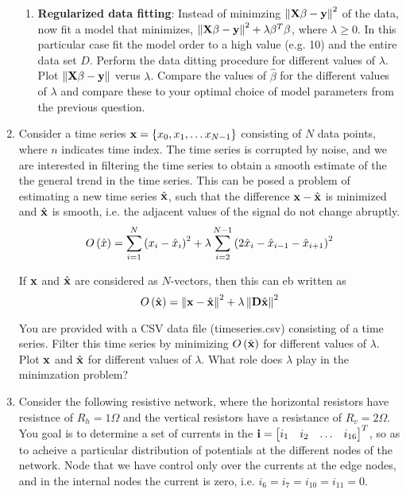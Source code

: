 \documentclass[9pt]{article}
\def\mf{\ensuremath\mathbf}
\def\lp{\ensuremath\left(}
\def\rp{\ensuremath\right)}
\def\lV{\ensuremath\left\lVert}
\def\rV{\ensuremath\right\rVert}
\def\lc{\ensuremath\left\{}
\def\rc{\ensuremath\right\}}
\def\bmx{\ensuremath\begin{bmatrix*}[r]}
\def\emx{\ensuremath\end{bmatrix*}}
\begin{document}
\begin{multicols}{2}
\begin{enumerate}
\begin{enumerate}
        \item \textbf{Regularized data fitting}: Instead of minimzing $\lV\mf{X}\beta - \mf{y}\rV^2$ of the data, now fit a model that minimizes, $\lV\mf{X}\beta - \mf{y}\rV^2 + \lambda\beta^T\beta$, where $\lambda \geq 0$. In this particular case fit the model order to a high value (e.g. 10) and the entire data set $D$. Perform the data ditting procedure for different values of $\lambda$. Plot $\lV\mf{X}\beta - \mf{y}\rV$ verus $\lambda$. Compare the values of $\hat{\beta}$ for the different values of $\lambda$ and compare these to your optimal choice of model parameters from the previous question.
    \end{enumerate}

    \item Consider a time series $\mf{x} = \lc x_0, x_1,\ldots x_{N-1} \rc$ consisting of $N$ data points, where $n$ indicates time index. The time series is corrupted by noise, and we are interested in filtering the time series to obtain a smooth estimate of the the general trend in the time series. This can be posed a problem of estimating a new time series $\hat{\mf{x}}$, such that the difference $\mf{x} - \hat{\mf{x}}$ is minimized and $\hat{\mf{x}}$ is smooth, i.e. the adjacent values of the signal do not change abruptly. 
    \[ O\lp \hat{x} \rp = \sum_{i = 1}^{N} \lp x_i - \hat{x}_i \rp^2 + \lambda \sum_{i = 2}^{N-1} \lp 2 \hat{x}_i - \hat{x}_{i-1} - \hat{x}_{i+1} \rp^2 \]

    If $\mf{x}$ and $\hat{\mf{x}}$ are considered as $N$-vectors, then this can eb written as 
    \[ O\lp \hat{\mf{x}} \rp = \lV \mf{x} - \hat{\mf{x}} \rV^2 + \lambda \lV \mf{D}\hat{\mf{x}} \rV^2 \]

    You are provided with a CSV data file (timeseries.csv) consisting of a time series. Filter this time series by minimizing $O\lp\hat{\mf{x}}\rp$ for different values of $\lambda$. Plot $\mf{x}$ and $\hat{\mf{x}}$ for different values of $\lambda$. What role does $\lambda$ play in the minimzation problem?

    \item Consider the following resistive network, where the horizontal resistors have resistnce of $R_h = 1\Omega$ and the vertical resistors have a resistance of $R_v = 2\Omega$. You goal is to determine a set of currents in the $\mf{i} = \bmx i_1 & i_2 & \ldots & i_{16}\emx^T$, so as to acheive a particular distribution of potentials at the different nodes of the network. Node that we have control only over the currents at the edge nodes, and in the internal nodes the current is zero, i.e. $i_6 = i_7 = i_{10} = i_{11} = 0$.


\end{enumerate}
\end{multicols}
\end{document}
